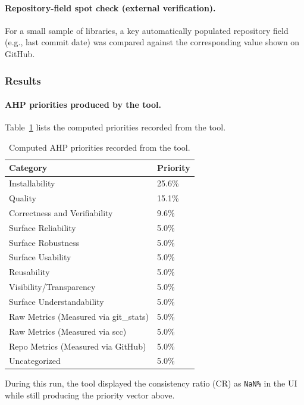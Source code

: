\documentclass[12pt, titlepage]{article}
\begin{document}
\paragraph{Repository-field spot check (external verification).}
For a small sample of libraries, a key automatically populated repository
field (e.g., last commit date) was compared against the corresponding value
shown on GitHub.

\subsubsection{Results}

\paragraph{AHP priorities produced by the tool.}
Table~\ref{tab:tnf4-priorities} lists the computed priorities recorded from
the tool.

\begin{table}[ht]
  \centering
  \caption{Computed AHP priorities recorded from the tool.}
  \label{tab:tnf4-priorities}
  \begin{tabular}{@{}p{}p{}@{}}
    \toprule
    \textbf{Category} & \textbf{Priority} \\
    \midrule
    Installability & 25.6\% \\
    Quality & 15.1\% \\
    Correctness and Verifiability & 9.6\% \\
    Surface Reliability & 5.0\% \\
    Surface Robustness & 5.0\% \\
    Surface Usability & 5.0\% \\
    Reusability & 5.0\% \\
    Visibility/Transparency & 5.0\% \\
    Surface Understandability & 5.0\% \\
    Raw Metrics (Measured via git\_stats) & 5.0\% \\
    Raw Metrics (Measured via scc) & 5.0\% \\
    Repo Metrics (Measured via GitHub) & 5.0\% \\
    Uncategorized & 5.0\% \\
    \bottomrule
  \end{tabular}
\end{table}

During this run, the tool displayed the consistency ratio (CR) as
\texttt{NaN\%} in the UI while still producing the priority vector above.
\end{document}
